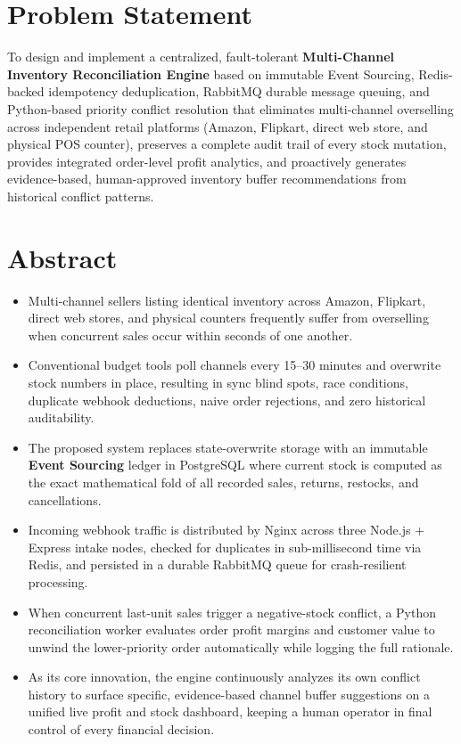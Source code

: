 \documentclass[oneside,a4paper,12pt]{report}
\begin{document}
\section{Problem Statement}
\label{sec:problem}
To design and implement a centralized, fault-tolerant \textbf{Multi-Channel Inventory Reconciliation Engine} based on immutable Event Sourcing, Redis-backed idempotency deduplication, RabbitMQ durable message queuing, and Python-based priority conflict resolution that eliminates multi-channel overselling across independent retail platforms (Amazon, Flipkart, direct web store, and physical POS counter), preserves a complete audit trail of every stock mutation, provides integrated order-level profit analytics, and proactively generates evidence-based, human-approved inventory buffer recommendations from historical conflict patterns.

\section{Abstract}
\begin{itemize}
  \item Multi-channel sellers listing identical inventory across Amazon, Flipkart, direct web stores, and physical counters frequently suffer from overselling when concurrent sales occur within seconds of one another.
  \item Conventional budget tools poll channels every 15--30 minutes and overwrite stock numbers in place, resulting in sync blind spots, race conditions, duplicate webhook deductions, naive order rejections, and zero historical auditability.
  \item The proposed system replaces state-overwrite storage with an immutable \textbf{Event Sourcing} ledger in PostgreSQL where current stock is computed as the exact mathematical fold of all recorded sales, returns, restocks, and cancellations.
  \item Incoming webhook traffic is distributed by Nginx across three Node.js + Express intake nodes, checked for duplicates in sub-millisecond time via Redis, and persisted in a durable RabbitMQ queue for crash-resilient processing.
  \item When concurrent last-unit sales trigger a negative-stock conflict, a Python reconciliation worker evaluates order profit margins and customer value to unwind the lower-priority order automatically while logging the full rationale.
  \item As its core innovation, the engine continuously analyzes its own conflict history to surface specific, evidence-based channel buffer suggestions on a unified live profit and stock dashboard, keeping a human operator in final control of every financial decision.
\end{itemize}
\end{document}
